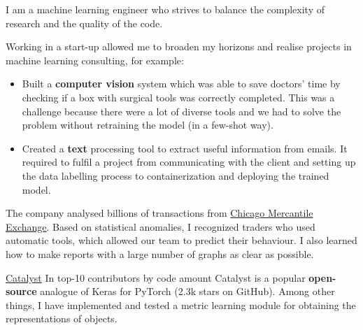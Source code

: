 \documentclass[10pt,a4paper,ragged2e,withhyper]{altacv}
\begin{document}


\makecvheader


\smallskip
I am a machine learning engineer who strives to balance the complexity of research and the quality of the code.

\begin{paracol}{2}


Working in a start-up allowed me to broaden my horizons and realise projects in machine learning consulting, for example:
\begin{itemize}
\item Built a \textbf{computer vision} system which was able to save doctors' time by checking if a box with surgical tools was correctly completed. This was a challenge because there were a lot of diverse tools and we had to solve the problem without retraining the model (in a few-shot way).
\item Created a \textbf{text} processing tool to extract useful information from emails. It required to fulfil a project from communicating with the client and setting up the data labelling process to containerization and deploying the trained model.
\end{itemize}

\divider

The company analysed billions of transactions from \href{https://en.wikipedia.org/wiki/Chicago_Mercantile_Exchange}
{Chicago Mercantile Exchange}.
Based on statistical anomalies, I recognized traders who used automatic tools, which allowed our team to predict their behaviour.
I also learned how to make reports with a large number of graphs as clear as possible.


\cvevent
{\href{https://github.com/catalyst-team/catalyst}{Catalyst}}
{In top-10 contributors by code amount}{}{}
Catalyst is a popular \textbf{open-source} analogue of Keras for PyTorch (2.3k stars on GitHub).
Among other things, I have implemented and tested a metric learning module for obtaining the representations of objects.
\smallskip


\end{paracol}
\end{document}
